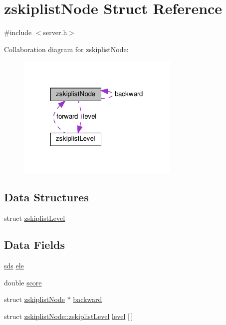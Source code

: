 \hypertarget{structzskiplist_node}{}\section{zskiplist\+Node Struct Reference}
\label{structzskiplist_node}


{\ttfamily \#include $<$server.\+h$>$}



Collaboration diagram for zskiplist\+Node\+:
\nopagebreak
\begin{figure}[H]
\begin{center}
\leavevmode
\includegraphics[width=220pt]{structzskiplist_node__coll__graph}
\end{center}
\end{figure}
\subsection*{Data Structures}
\begin{DoxyCompactItemize}
\item 
struct \hyperlink{structzskiplist_node_1_1zskiplist_level}{zskiplist\+Level}
\end{DoxyCompactItemize}
\subsection*{Data Fields}
\begin{DoxyCompactItemize}
\item 
\hyperlink{sds_8h_ad69abac3df4532879db9642c95f5ef6f}{sds} \hyperlink{structzskiplist_node_ac99cd495189c228ff8d538f04489805e}{ele}
\item 
double \hyperlink{structzskiplist_node_a40a24ec85daa9ac70aa74e4ca744f838}{score}
\item 
struct \hyperlink{structzskiplist_node}{zskiplist\+Node} $\ast$ \hyperlink{structzskiplist_node_a060155bb4ea50dabba713eac3451d80e}{backward}
\item 
struct \hyperlink{structzskiplist_node_1_1zskiplist_level}{zskiplist\+Node\+::zskiplist\+Level} \hyperlink{structzskiplist_node_ab6e002b167ff0de655b16debe293180c}{level} \mbox{[}$\,$\mbox{]}
\end{DoxyCompactItemize}


